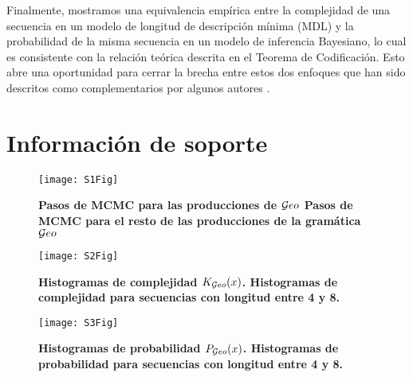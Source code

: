 Finalmente, mostramos una equivalencia empírica entre la complejidad de una secuencia en un modelo de longitud de descripción mínima (MDL) y la probabilidad de la misma secuencia en un modelo de inferencia Bayesiano, lo cual es consistente con la relación teórica descrita en el Teorema de Codificación. Esto abre una oportunidad para cerrar la brecha entre estos dos enfoques que han sido descritos como complementarios por algunos autores \cite{mackay2003information}.

\section{Información de soporte}

\begin{figure}[htpb]
    \centering
    \texttt{[image: S1Fig]}
    \caption{\bf{Pasos de MCMC para las producciones de $\mathcal Geo$} Pasos de MCMC para el resto de las producciones de la gramática $\mathcal Geo$}
    \label{S1_Fig}
\end{figure}

\begin{figure}[htpb]
    \centering
    \texttt{[image: S2Fig]}
    \caption{\bf{Histogramas de complejidad $K_{\mathcal Geo}(x)$}. Histogramas de complejidad para secuencias con longitud entre 4 y 8.}
    \label{S2_Fig}
\end{figure}

\begin{figure}[htpb]
    \centering
    \texttt{[image: S3Fig]}
    \caption{\bf{Histogramas de probabilidad $P_{\mathcal Geo}(x)$}. Histogramas de probabilidad para secuencias con longitud entre 4 y 8.}
    \label{S3_Fig}
\end{figure}
